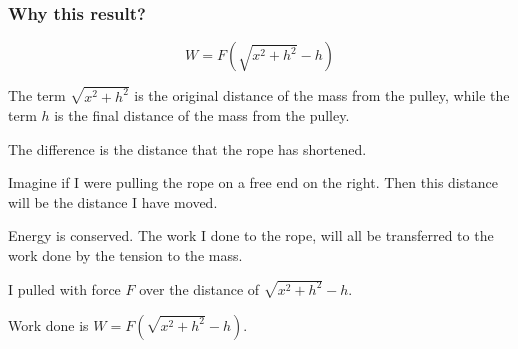 \documentclass{beamer}
\begin{document}
        \begin{frame}
            \frametitle{Why this result?}

            $$
            W = F \left(\sqrt{x^2 + h^2} - h\right)
            $$
            \pause
            
            The term $\sqrt{x^2 + h^2}$ is the original distance of the mass from the pulley, while the term $h$ is the final distance of the mass from the pulley.\pause

            The difference is the distance that the rope has shortened.\pause

            Imagine if I were pulling the rope on a free end on the right. Then this distance will be the distance I have moved.\pause

            Energy is conserved. The work I done to the rope, will all be transferred to the work done by the tension to the mass.\pause

            I pulled with force $F$ over the distance of $\sqrt{x^2 + h^2} - h$.\pause

            Work done is $W = F \left(\sqrt{x^2 + h^2} - h\right)$.
        \end{frame}
        
\end{document}
